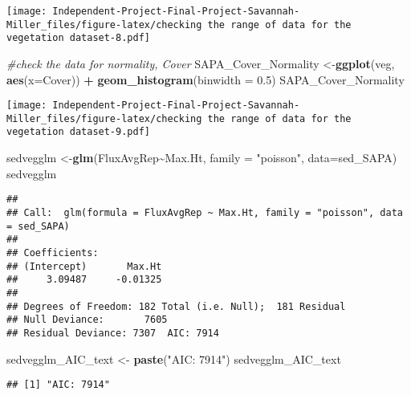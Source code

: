 \documentclass[
]{article}
\newenvironment{Shaded}{\begin{snugshade}}{\end{snugshade}}
\newcommand{\AttributeTok}[1]{\textcolor[rgb]{0.13,0.29,0.53}{#1}}
\newcommand{\CommentTok}[1]{\textcolor[rgb]{0.56,0.35,0.01}{\textit{#1}}}
\newcommand{\FloatTok}[1]{\textcolor[rgb]{0.00,0.00,0.81}{#1}}
\newcommand{\FunctionTok}[1]{\textcolor[rgb]{0.13,0.29,0.53}{\textbf{#1}}}
\newcommand{\NormalTok}[1]{#1}
\newcommand{\OtherTok}[1]{\textcolor[rgb]{0.56,0.35,0.01}{#1}}
\newcommand{\SpecialCharTok}[1]{\textcolor[rgb]{0.81,0.36,0.00}{\textbf{#1}}}
\newcommand{\StringTok}[1]{\textcolor[rgb]{0.31,0.60,0.02}{#1}}
\begin{document}
\texttt{[image: Independent-Project-Final-Project-Savannah-Miller\_files/figure-latex/checking the range of data for the vegetation dataset-8.pdf]}

\begin{Shaded}
\begin{Highlighting}[]
\CommentTok{\#check the data for normality, Cover }
\NormalTok{SAPA\_Cover\_Normality }\OtherTok{\textless{}{-}}\FunctionTok{ggplot}\NormalTok{(veg, }\FunctionTok{aes}\NormalTok{(}\AttributeTok{x=}\NormalTok{Cover)) }\SpecialCharTok{+} \FunctionTok{geom\_histogram}\NormalTok{(}\AttributeTok{binwidth =} \FloatTok{0.5}\NormalTok{)}
\NormalTok{SAPA\_Cover\_Normality}
\end{Highlighting}
\end{Shaded}

\texttt{[image: Independent-Project-Final-Project-Savannah-Miller\_files/figure-latex/checking the range of data for the vegetation dataset-9.pdf]}

\begin{Shaded}
\begin{Highlighting}[]
\NormalTok{sedvegglm }\OtherTok{\textless{}{-}}\FunctionTok{glm}\NormalTok{(FluxAvgRep}\SpecialCharTok{\textasciitilde{}}\NormalTok{Max.Ht, }\AttributeTok{family =} \StringTok{"poisson"}\NormalTok{, }\AttributeTok{data=}\NormalTok{sed\_SAPA)}
\NormalTok{sedvegglm}
\end{Highlighting}
\end{Shaded}

\begin{verbatim}
## 
## Call:  glm(formula = FluxAvgRep ~ Max.Ht, family = "poisson", data = sed_SAPA)
## 
## Coefficients:
## (Intercept)       Max.Ht  
##     3.09487     -0.01325  
## 
## Degrees of Freedom: 182 Total (i.e. Null);  181 Residual
## Null Deviance:       7605 
## Residual Deviance: 7307  AIC: 7914
\end{verbatim}

\begin{Shaded}
\begin{Highlighting}[]
\NormalTok{sedvegglm\_AIC\_text }\OtherTok{\textless{}{-}} \FunctionTok{paste}\NormalTok{(}\StringTok{"AIC: 7914"}\NormalTok{)}
\NormalTok{sedvegglm\_AIC\_text}
\end{Highlighting}
\end{Shaded}

\begin{verbatim}
## [1] "AIC: 7914"
\end{verbatim}
\end{document}
